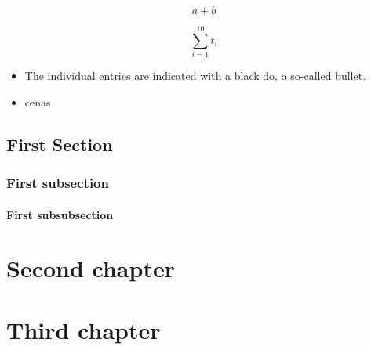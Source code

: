\documentclass[12pt,a4paper]{report}
\begin{document}
$$ a+b $$

$$\sum_{i=1}^{10} t_i $$


\begin{itemize}
	\item The individual entries are indicated with a black do, a so-called bullet.
	\item cenas
\end{itemize}

\section{First Section}
\subsection{First subsection}
\subsubsection{First subsubsection}
\chapter{Second chapter}

%

\chapter{Third chapter}
\end{document}
